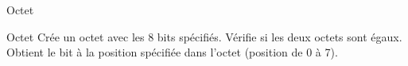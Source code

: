 \usepackage{algorithmeUTF8}
\begin{tad}




    \begin{tadOperations}{Octet}
            {}%
            {}
            {}%
            {\tadUnParam{\booleen}}
            {}%
            {}
    \end{tadOperations}

    \begin{tadSemantiques}{Octet}
			{Crée un octet avec les 8 bits spécifiés.}%
			{Vérifie si les deux octets sont égaux.}  
			{Obtient le bit à la position spécifiée dans l'octet (position de 0 à 7).}  
    \end{tadSemantiques}

    \begin{tadAxiomes}
    \end{tadAxiomes}

\end{tad}